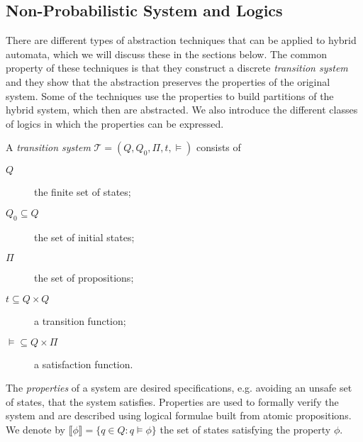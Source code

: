 \subsection{Non-Probabilistic System and Logics}
There are different types of abstraction techniques that can be applied to hybrid automata, which we will discuss these in the sections below. The common property of these techniques is that they construct a discrete \emph{transition system} and they show that the abstraction preserves the properties of the original system. Some of the techniques use the properties to build partitions of the hybrid system, which then are abstracted. We also introduce the different classes of logics in which the properties can be expressed.
\begin{defi}
A \emph{transition system} $\mathcal{T}=(Q,Q_{0},\Pi,t,\models)$ consists of
\begin{description}
    \item[$Q$]{the finite set of states;}
    \item[$Q_{0}\subseteq Q$]{the set of initial states;}
    \item[$\Pi$]{the set of propositions;}
    \item[$t \subseteq Q\times Q$]{a transition function;}
    \item[$\models\subseteq Q\times\Pi$]{a satisfaction function.}
\end{description}
\end{defi}

The \emph{properties} of a system are desired specifications, e.g. avoiding an unsafe set of states, that the system satisfies. Properties are used to formally verify the system and are described using logical formulae built from atomic propositions. We denote by $\llbracket \phi \rrbracket = \{ q\in Q : q\models \phi\}$ the set of states satisfying the property $\phi$.


